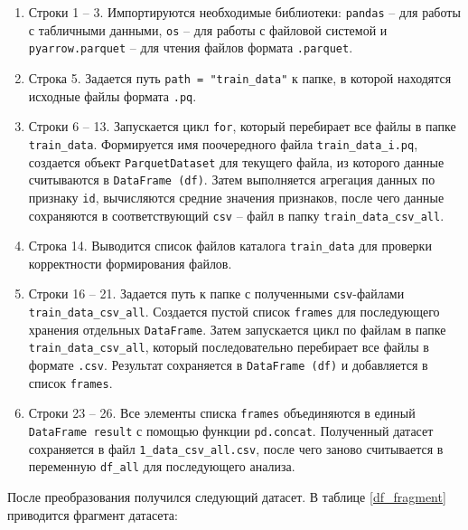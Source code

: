 	\begin{enumerate}[nosep]
	       \item Строки 1 -- 3. Импортируются необходимые библиотеки: \texttt{pandas} -- для работы с табличными данными, \texttt{os} -- для работы с файловой системой и \texttt{pyarrow.parquet} -- для чтения файлов формата \texttt{.parquet}.
               \item Строка 5. Задается путь \texttt{path = "train\_data"} к папке,
в которой находятся исходные файлы формата \texttt{.pq}.
               \item Строки 6 -- 13. Запускается цикл \texttt{for}, который перебирает все файлы в папке \texttt{train\_data}. Формируется имя поочередного файла \texttt{train\_data\_i.pq}, создается объект \texttt{ParquetDataset} для текущего файла, из которого данные считываются в \texttt{DataFrame (df)}. Затем выполняется агрегация данных по признаку \texttt{id}, вычисляются средние значения признаков, после чего данные сохраняются в соответствующий \texttt{csv} -- файл в папку \texttt{train\_data\_csv\_all}.
               \item Строка 14. Выводится список файлов каталога \texttt{train\_data} для проверки корректности формирования файлов.
               \item Строки 16 -- 21. Задается путь к папке с полученными \texttt{csv}-файлами \texttt{train\_data\_csv\_all}. Создается пустой список \texttt{frames} для последующего хранения отдельных \texttt{DataFrame}. Затем запускается цикл по файлам в папке \texttt{train\_data\_csv\_all}, который последовательно перебирает все файлы в формате \texttt{.csv}. Результат сохраняется в \texttt{DataFrame (df)} и добавляется в список \texttt{frames}. 
               \item Строки 23 -- 26. Все элементы списка \texttt{frames} объединяются в единый \texttt{DataFrame result} с помощью функции \texttt{pd.concat}. Полученный датасет сохраняется в файл \texttt{1\_data\_csv\_all.csv}, после чего заново считывается в переменную \texttt{df\_all} для последующего анализа.
        \end{enumerate}
        
        После преобразования получился следующий датасет. В таблице \ref{df_fragment} приводится фрагмент датасета:
        

